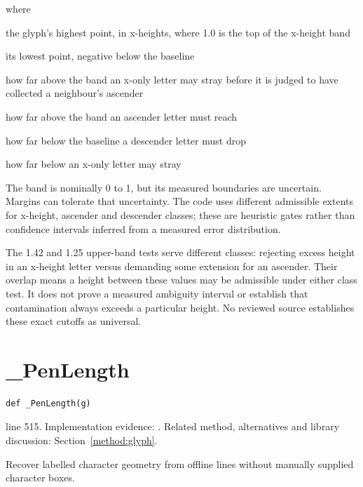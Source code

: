 \noindent where
\begin{description}[leftmargin=2.4em,style=nextline,font=\normalfont\ttfamily]\setlength\itemsep{1pt}
  \item[{$\mathrm{top}$}] \normalfont the glyph's highest point, in x-heights, where 1.0 is the top of the x-height band
  \item[{$\mathrm{bot}$}] \normalfont its lowest point, negative below the baseline
  \item[{$1.42$}] \normalfont how far above the band an x-only letter may stray before it is judged to have collected a neighbour's ascender
  \item[{$1.25$}] \normalfont how far above the band an ascender letter must reach
  \item[{$-0.20$}] \normalfont how far below the baseline a descender letter must drop
  \item[{$-0.42$}] \normalfont how far below an x-only letter may stray
\end{description}

The band is nominally 0 to 1, but its measured boundaries are uncertain. Margins can tolerate that uncertainty. The code uses different admissible extents for x-height, ascender and descender classes; these are heuristic gates rather than confidence intervals inferred from a measured error distribution.

The 1.42 and 1.25 upper-band tests serve different classes: rejecting excess height in an x-height letter versus demanding some extension for an ascender. Their overlap means a height between these values may be admissible under either class test. It does not prove a measured ambiguity interval or establish that contamination always exceeds a particular height. No reviewed source establishes these exact cutoffs as universal.



\section{\_PenLength}\label{fn:style:-PenLength}
\begin{lstlisting}[style=sig]
def _PenLength(g)
\end{lstlisting}
 line 515. Implementation evidence: \cite{code2026}. Related method, alternatives and library discussion: Section~\ref{method:glyph}.


Recover labelled character geometry from offline lines without manually supplied character boxes.




